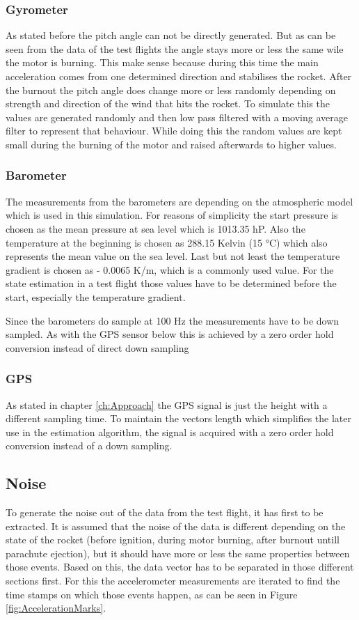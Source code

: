 \subsubsection{Gyrometer}
As stated before the pitch angle can not be directly generated.
But as can be seen from the data of the test flights the angle stays more or less the same wile the motor is burning.
This make sense because during this time the main acceleration comes from one determined direction and stabilises the rocket.
After the burnout the pitch angle does change more or less randomly depending on strength and direction of the wind that hits the rocket.
To simulate this the values are generated randomly and then low pass filtered with a moving average filter to represent that behaviour.
While doing this the random values are kept small during the burning of the motor and raised afterwards to higher values.

\subsubsection{Barometer}
The measurements from the barometers are depending on the atmospheric model which is used in this simulation.
For reasons of simplicity the start pressure is chosen as the mean pressure at sea level which is 1013.35 hP.
Also the temperature at the beginning is chosen as 288.15 Kelvin (15 °C) which also represents the mean value on the sea level.
Last but not least the temperature gradient is chosen as - 0.0065 K/m, which is a commonly used value.
For the state estimation in a test flight those values have to be determined before the start, especially the temperature gradient.

Since the barometers do sample at 100 Hz the measurements have to be down sampled.
As with the GPS sensor below this is achieved by a zero order hold conversion instead of direct down sampling

\subsubsection{GPS}
As stated in chapter \ref{ch:Approach} the GPS signal is just the height with a different sampling time.
To maintain the vectors length which simplifies the later use in the estimation algorithm,
the signal is acquired with a zero order hold conversion instead of a down sampling.


\subsection{Noise}
To generate the noise out of the data from the test flight, it has first to be extracted.
It is assumed that the noise of the data is different depending on the state of the rocket (before ignition, during motor burning, after burnout untill parachute ejection),
but it should have more or less the same properties between those events.
Based on this, the data vector has to be separated in those different sections first.
For this the accelerometer measurements are iterated to find the time stamps on which those events happen, as can be seen in Figure \ref{fig:AccelerationMarks}.


